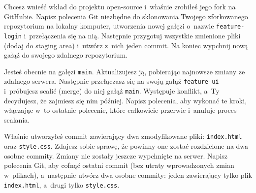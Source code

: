 \documentclass[11pt,a4paper,addpoints]{exam}
\begin{document}
\cellwidth{2.75cm}
\noindent \gradetable[h]

\vspace{0.8cm}

\begin{questions}

\question[2] 
Chcesz wnieść wkład do projektu open-source i~właśnie zrobiłeś jego fork na GitHubie. Napisz polecenia Git niezbędne do sklonowania Twojego zforkowanego repozytorium na lokalny komputer, utworzenia nowej gałęzi o~nazwie \texttt{feature-login} i~przełączenia się na nią. Następnie przygotuj wszystkie zmienione pliki (dodaj do staging area) i~utwórz z~nich jeden commit. Na koniec wypchnij nową gałąź do swojego zdalnego repozytorium.
\fillwithdottedlines{6cm}

\question[2] 
Jesteś obecnie na gałęzi \texttt{main}. Aktualizujesz ją, pobierając najnowsze zmiany ze zdalnego serwera. Następnie przełączasz się na swoją gałąź \texttt{feature-ui} i~próbujesz scalić (merge) do niej gałąź \texttt{main}. Występuje konflikt, a~Ty decydujesz, że zajmiesz się nim później. Napisz polecenia, aby wykonać te kroki, włączając w~to ostatnie polecenie, które całkowicie przerwie i~anuluje proces scalania.
\fillwithdottedlines{6cm}

\newpage

\question[1] 
Właśnie utworzyłeś commit zawierający dwa zmodyfikowane pliki: \texttt{index.html} oraz \texttt{style.css}. Zdajesz sobie sprawę, że powinny one zostać rozdzielone na dwa osobne commity. Zmiany nie zostały jeszcze wypchnięte na serwer. Napisz polecenia Git, aby cofnąć ostatni commit (bez utraty wprowadzonych zmian w~plikach), a~następnie utwórz dwa osobne commity: jeden zawierający tylko plik \texttt{index.html}, a~drugi tylko \texttt{style.css}.
\fillwithdottedlines{7cm}

\end{questions}
\end{document}
